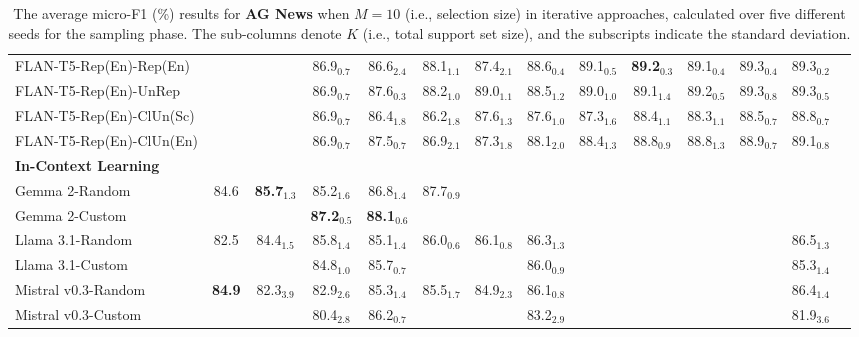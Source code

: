 \documentclass[11pt]{article}
\theoremstyle{definition}
\begin{document}
\begin{table*}[hbt]
{\begin{tabular}{l|ccccccccccccc}
FLAN-T5-Rep(En)-Rep(En) &
& & 86.9$_{0.7}$ & 86.6$_{2.4}$ & 88.1$_{1.1}$ & 87.4$_{2.1}$ & 88.6$_{0.4}$ & 89.1$_{0.5}$ & \textbf{89.2}$_{0.3}$ & 89.1$_{0.4}$ & 89.3$_{0.4}$ & 89.3$_{0.2}$ & \\

FLAN-T5-Rep(En)-UnRep &
& & 86.9$_{0.7}$ & 87.6$_{0.3}$ & 88.2$_{1.0}$ & 89.0$_{1.1}$ & 88.5$_{1.2}$ & 89.0$_{1.0}$ & 89.1$_{1.4}$ & 89.2$_{0.5}$ & 89.3$_{0.8}$ & 89.3$_{0.5}$ & \\

FLAN-T5-Rep(En)-ClUn(Sc) &
& & 86.9$_{0.7}$ & 86.4$_{1.8}$ & 86.2$_{1.8}$ & 87.6$_{1.3}$ & 87.6$_{1.0}$ & 87.3$_{1.6}$ & 88.4$_{1.1}$ & 88.3$_{1.1}$ & 88.5$_{0.7}$ & 88.8$_{0.7}$ & \\

FLAN-T5-Rep(En)-ClUn(En) &
& & 86.9$_{0.7}$ & 87.5$_{0.7}$ & 86.9$_{2.1}$ & 87.3$_{1.8}$ & 88.1$_{2.0}$ & 88.4$_{1.3}$ & 88.8$_{0.9}$ & 88.8$_{1.3}$ & 88.9$_{0.7}$ & 89.1$_{0.8}$ & \\

\hdashline

\textbf{In-Context Learning} \\

Gemma 2-Random &
84.6 & \textbf{85.7}$_{1.3}$ & 85.2$_{1.6}$ & 86.8$_{1.4}$ & 87.7$_{0.9}$ & & & \\
Gemma 2-Custom &
& & \textbf{87.2}$_{0.5}$ & \textbf{88.1}$_{0.6}$ & & & \\

\hdashline[1pt/4pt]

Llama 3.1-Random &
82.5 & 84.4$_{1.5}$ & 85.8$_{1.4}$ & 85.1$_{1.4}$ & 86.0$_{0.6}$ & 86.1$_{0.8}$ & 86.3$_{1.3}$ & & & & & 86.5$_{1.3}$ \\
Llama 3.1-Custom &
& & 84.8$_{1.0}$ & 85.7$_{0.7}$ & & & 86.0$_{0.9}$ & & & & & 85.3$_{1.4}$ & \\

\hdashline[1pt/4pt]

Mistral v0.3-Random &
\textbf{84.9} & 82.3$_{3.9}$ & 82.9$_{2.6}$ & 85.3$_{1.4}$ & 85.5$_{1.7}$ & 84.9$_{2.3}$ & 86.1$_{0.8}$ & & & & & 86.4$_{1.4}$ \\
Mistral v0.3-Custom &
& & 80.4$_{2.8}$ & 86.2$_{0.7}$ & & & 83.2$_{2.9}$ & & & & & 81.9$_{3.6}$ & \\

\hline

\end{tabular}
}
\caption{The average micro-F1 (\%) results for {\bf AG News} when $M=10$ (i.e., selection size) in iterative approaches, calculated over five different seeds for the sampling phase. The sub-columns denote $K$ (i.e., total support set size), and the subscripts indicate the standard deviation.}
\label{table:agnews-complete}
\end{table*}
\end{document}
